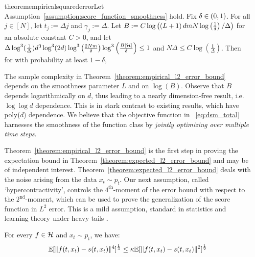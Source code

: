 \begin{restatable}{theorem}{empiricalsquarederror}\label{theorem:empirical_l2_error_bound}Let Assumption~\ref{assumption:score_function_smoothness} hold. Fix $\delta \in \left(0,1\right)$. For all $j \in [N]$, let $t_{j} := \Delta j$ and $\gamma_{j} := \Delta$. Let $B := C\log\left(\left(L+1\right)dmN\log\left(\frac{1}{\delta}\right)/\Delta\right)$ for an absolute constant $C > 0$, and let $\Delta\log^3(\tfrac{1}{\Delta})d^{3}\log^3(2d)\log^3\left(\frac{2Nm}{\delta}\right)\log^3\left(\frac{B|\mathcal{H}|}{\delta}\right) \leq 1$ and $N\Delta \leq C\log(\frac{1}{\Delta})$. Then for
with probability at least $1-\delta$, 
\end{restatable}

\begin{remark}
    The sample complexity in Theorem~\ref{theorem:empirical_l2_error_bound} depends on the smoothness parameter $L$ and on $\log(B)$. Observe that $B$ depends logarithmically on $d$, thus leading to a nearly dimension-free result, i.e. $\log\log d$ dependence. This is in stark contrast to existing results, which have poly($d$) dependence. We believe that the objective function in ~\eqref{eq:dsm_total} harnesses the smoothness of the function class by \textit{jointly optimizing over multiple time steps}.
\end{remark}
Theorem~\ref{theorem:empirical_l2_error_bound} is the first step in proving the expectation bound in Theorem~\ref{theorem:expected_l2_error_bound} and may be of independent interest. Theorem~\ref{theorem:expected_l2_error_bound} deals with the noise arising from the data $x_{t} \sim p_{t}$. Our next assumption, called `hypercontractivity', controls the $4^{\text{th}}$-moment of the error bound with respect to the $2^{\text{nd}}$-moment, which can be used to prove the generalization of the score function in $L^2$ error. This is a mild assumption, standard in statistics and learning theory under heavy tails \cite{mendelson2020robust,klivans2018efficient,minsker2018sub}.
\begin{assumption}\label{assumption:hypercontractivity}
    For every $f \in \mathcal{H}$ and $x_t \sim p_t$, we have:
    $$\mathbb{E}[\|f(t,x_t) - s(t,x_t)\|^4]^{\frac{1}{4}} \leq \kappa \mathbb{E}[\|f(t,x_t)-s(t,x_t)\|^2]^{\frac{1}{2}}$$
\end{assumption}

